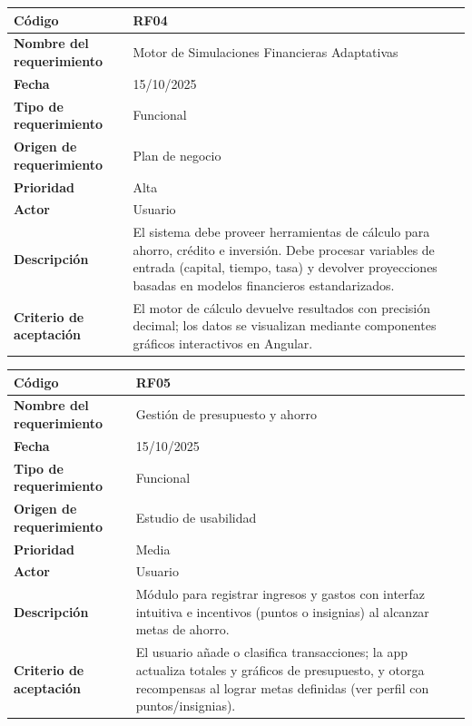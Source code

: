 \begin{table}[H]
	\begin{tabular}{|a{5cm}|m{11cm}|}
		\hline
		\textbf{Código} & RF04 \\ \hline
		\textbf{Nombre del requerimiento} & Motor de Simulaciones Financieras Adaptativas \\ \hline
		\textbf{Fecha} & 15/10/2025 \\ \hline
		\textbf{Tipo de requerimiento} & Funcional \\ \hline
		\textbf{Origen de requerimiento} & Plan de negocio \\ \hline
		\textbf{Prioridad} & Alta \\ \hline
		\textbf{Actor} & Usuario \\ \hline
		\textbf{Descripción} & El sistema debe proveer herramientas de cálculo para ahorro, crédito e inversión. Debe procesar variables de entrada (capital, tiempo, tasa) y devolver proyecciones basadas en modelos financieros estandarizados. \\ \hline
		\textbf{Criterio de aceptación} & El motor de cálculo devuelve resultados con precisión decimal; los datos se visualizan mediante componentes gráficos interactivos en Angular. \\ \hline
	\end{tabular}
\end{table}


\begin{table}[H]
	\begin{tabular}{|a{5cm}|m{11cm}|}
		\hline
		\textbf{Código} & RF05 \\ \hline
		\textbf{Nombre del requerimiento} & Gestión de presupuesto y ahorro \\ \hline
		\textbf{Fecha} & 15/10/2025 \\ \hline
		\textbf{Tipo de requerimiento} & Funcional \\ \hline
		\textbf{Origen de requerimiento} & Estudio de usabilidad \\ \hline
		\textbf{Prioridad} & Media \\ \hline
		\textbf{Actor} & Usuario \\ \hline
		\textbf{Descripción} & Módulo para registrar ingresos y gastos con interfaz intuitiva e incentivos (puntos o insignias) al alcanzar metas de ahorro. \\ \hline
		\textbf{Criterio de aceptación} & El usuario añade o clasifica transacciones; la app actualiza totales y gráficos de presupuesto, y otorga recompensas al lograr metas definidas (ver perfil con puntos/insignias). \\ \hline
	\end{tabular}
\end{table}

